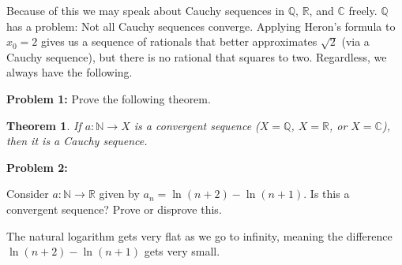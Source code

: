 \documentclass{article}
\theoremstyle{normal}
\newtheorem{theorem}{Theorem}
\newif\ifsolution
\begin{document}
        Because of this we may speak about Cauchy sequences in
        $\mathbb{Q}$, $\mathbb{R}$, and $\mathbb{C}$ freely. $\mathbb{Q}$ has
        a problem: Not all Cauchy sequences converge. Applying Heron's formula
        to $x_{0}=2$ gives us a sequence of rationals that better approximates
        $\sqrt{2}$ (via a Cauchy sequence), but there is no rational that
        squares to two. Regardless, we always have the following.
        \par\hfill\par
        \textbf{Problem 1:}
        Prove the following theorem.
        \begin{theorem}
            If $a:\mathbb{N}\rightarrow{X}$ is a convergent sequence
            ($X=\mathbb{Q}$, $X=\mathbb{R}$, or $X=\mathbb{C}$), then it is
            a Cauchy sequence.
        \end{theorem}
        \ifsolution
            \color{blue}
            \begin{proof}
                Since $a$ converges, there is a limit $L$. But then for all
                $\varepsilon>0$ there is an $N\in\mathbb{N}$ such that
                $n\in\mathbb{N}$ and $n>N$ implies $|a_{n}-L|<\varepsilon/2$.
                Let $n,m\in\mathbb{N}$ be two natural numbers that are
                larger than $N$. Then:
                \begin{align}
                    |a_{n}-a_{m}|
                    &=|a_{n}-L+L-a_{m}|\\
                    &\leq|a_{n}-L|+|L-a_{m}|\\
                    &<\frac{\varepsilon}{2}+\frac{\varepsilon}{2}\\
                    &=\varepsilon
                \end{align}
                That is, the sequence $a$ is a Cauchy sequence.
            \end{proof}
            \color{black}
        \fi
        \par\hfill\par
        \textbf{Problem 2:}
        \par
        Consider $a:\mathbb{N}\rightarrow\mathbb{R}$ given by
        $a_{n}=\ln(n+2)-\ln(n+1)$. Is this a convergent sequence?
        Prove or disprove this.
        \par\hfill\par
        \ifsolution
            \color{blue}
            The natural logarithm gets very flat as we go to infinity,
            meaning the difference $\ln(n+2)-\ln(n+1)$ gets very small.
\end{document}
